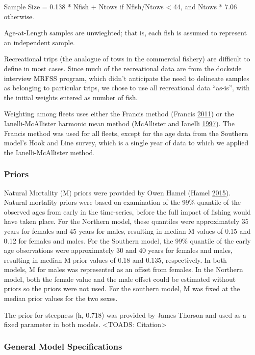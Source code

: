 \documentclass[12pt,]{article}
\begin{document}
Sample Size = 0.138 * Nfish + Ntows if Nfish/Ntows \textless{} 44, and
Ntows * 7.06 otherwise.

Age-at-Length samples are unwieghted; that is, each fish is assumed to
represent an independent sample.

Recreational trips (the analogue of tows in the commercial fishery) are
difficult to define in most cases. Since much of the recreational data
are from the dockside interview MRFSS program, which didn't anticipate
the need to delineate samples as belonging to particular trips, we chose
to use all recreational data ``as-is'', with the initial weights entered
as number of fish.

Weighting among fleets uses either the Francis method (Francis
\protect\hyperlink{ref-Francis2011}{2011}) or the Ianelli-McAllister
harmonic mean method (McAllister and Ianelli
\protect\hyperlink{ref-McAllister1997}{1997}). The Francis method was
used for all fleets, except for the age data from the Southern model's
Hook and Line survey, which is a single year of data to which we applied
the Ianelli-McAllister method.

\subsubsection{Priors}\label{priors}

Natural Mortality (M) priors were provided by Owen Hamel (Hamel
\protect\hyperlink{ref-Hamel2015}{2015}). Natural mortality priors were
based on examination of the 99\% quantile of the observed ages from
early in the time-series, before the full impact of fishing would have
taken place. For the Northern model, these quantiles were approximately
35 years for females and 45 years for males, resulting in median M
values of 0.15 and 0.12 for females and males. For the Southern model,
the 99\% quantile of the early age observations were approximately 30
and 40 years for females and males, resulting in median M prior values
of 0.18 and 0.135, respectively. In both models, M for males was
represented as an offset from females. In the Northern model, both the
female value and the male offset could be estimated without priors so
the priors were not used. For the southern model, M was fixed at the
median prior values for the two sexes.

The prior for steepness (h, 0.718) was provided by James Thorson and
used as a fixed parameter in both models. \textless{}TOADS:
Citation\textgreater{}

\subsubsection{General Model
Specifications}\label{general-model-specifications}
\end{document}
